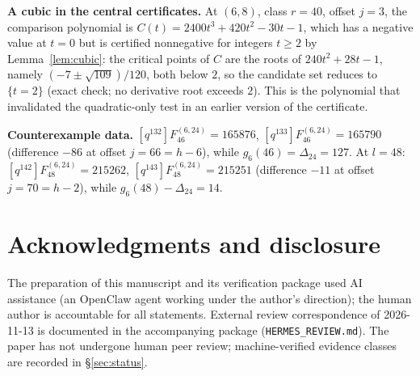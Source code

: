 \documentclass[11pt,reqno]{article}
\theoremstyle{definition}
\begin{document}
\textbf{A cubic in the central certificates.} At $(6,8)$, class $r=40$, offset $j=3$, the comparison polynomial is $C(t)=2400t^3+420t^2-30t-1$, which has a negative value at $t=0$ but is certified nonnegative for integers $t\ge2$ by Lemma~\ref{lem:cubic}: the critical points of $C$ are the roots of $240t^2+28t-1$, namely $(-7\pm\sqrt{109})/120$, both below $2$, so the candidate set reduces to $\{t=2\}$ (exact check; no derivative root exceeds $2$). This is the polynomial that invalidated the quadratic-only test in an earlier version of the certificate.

\textbf{Counterexample data.} $[q^{132}]F^{(6,24)}_{46}=165876$, $[q^{133}]F^{(6,24)}_{46}=165790$ (difference $-86$ at offset $j=66=h-6$), while $g_6(46)=\Delta_{24}=127$. At $l=48$: $[q^{142}]F^{(6,24)}_{48}=215262$, $[q^{143}]F^{(6,24)}_{48}=215251$ (difference $-11$ at offset $j=70=h-2$), while $g_6(48)-\Delta_{24}=14$.

\section*{Acknowledgments and disclosure}
The preparation of this manuscript and its verification package used AI assistance
(an OpenClaw agent working under the author's direction); the human author is
accountable for all statements. External review correspondence of 2026-11-13 is
documented in the accompanying package (\texttt{HERMES\_REVIEW.md}). The paper has
not undergone human peer review; machine-verified evidence classes are recorded in
\S\ref{sec:status}.
\end{document}
